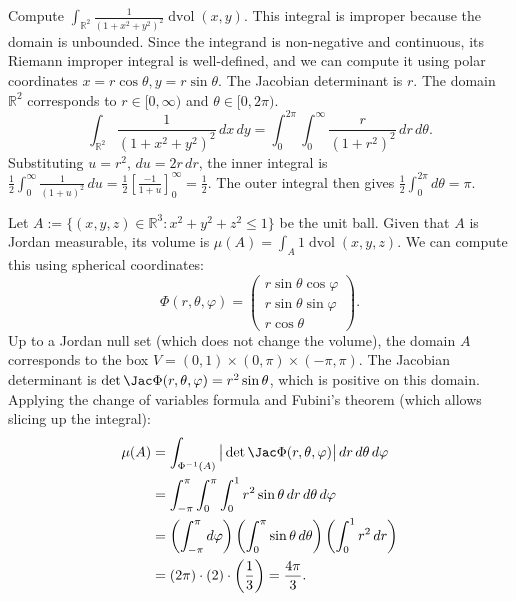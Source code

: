 \begin{example}
\label{ex:improper_integral_polar}
Compute $\int_{\mathbb{R}^2} \frac{1}{(1+x^2+y^2)^2} \mathop{d\text{vol}}(x,y)$.
This integral is improper because the domain is unbounded. Since the integrand is non-negative and continuous, its Riemann improper integral is well-defined, and we can compute it using polar coordinates $x = r\cos\theta, y = r\sin\theta$.
The Jacobian determinant is $r$. The domain $\mathbb{R}^2$ corresponds to $r \in [0, \infty)$ and $\theta \in [0, 2\pi)$.
\[
\int_{\mathbb{R}^2} \frac{1}{(1+x^2+y^2)^2} \,dx\,dy
= \int_0^{2\pi} \int_0^\infty \frac{r}{(1+r^2)^2} \,dr\,d\theta.
\]
Substituting $u = r^2$, $du = 2r\,dr$, the inner integral is $\frac{1}{2} \int_0^\infty \frac{1}{(1+u)^2} \,du = \frac{1}{2} \left[ \frac{-1}{1+u} \right]_0^\infty = \frac{1}{2}$.
The outer integral then gives $\frac{1}{2} \int_0^{2\pi} d\theta = \pi$.
\end{example}

\begin{example}
\label{ex:volume_sphere}
Let $A := \{(x,y,z) \in \mathbb{R}^3 : x^2+y^2+z^2 \leq 1\}$ be the unit ball. Given that $A$ is Jordan measurable, its volume is $\mu(A) = \int_A 1 \mathop{d\text{vol}}(x,y,z)$.
We can compute this using spherical coordinates:
\[\Phi(r,\theta,\varphi) = \begin{pmatrix} r\sin\theta\cos\varphi \\ r\sin\theta\sin\varphi \\ r\cos\theta \end{pmatrix}.\]
Up to a Jordan null set (which does not change the volume), the domain $A$ corresponds to the box $V = (0,1) \times (0,\pi) \times (-\pi,\pi)$.
The Jacobian determinant is $\det\Jac\Phi(r,\theta,\varphi) = r^2\sin\theta$, which is positive on this domain.
Applying the change of variables formula and Fubini's theorem (which allows slicing up the integral):
\begin{align*}
\mu(A) &= \int_{\Phi^{-1}(A)} \big|\det\Jac\Phi(r,\theta,\varphi)\big| \,dr\,d\theta\,d\varphi \\
&= \int_{-\pi}^\pi \int_0^\pi \int_0^1 r^2\sin\theta \,dr\,d\theta\,d\varphi \\
&= \left(\int_{-\pi}^\pi d\varphi\right) \left(\int_0^\pi \sin\theta \,d\theta\right) \left(\int_0^1 r^2 \,dr\right) \\
&= (2\pi) \cdot (2) \cdot \left(\frac{1}{3}\right) = \frac{4\pi}{3}.
\end{align*}
\end{example}

